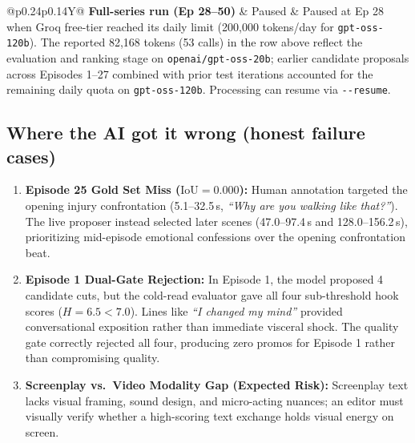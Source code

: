 \documentclass[10pt,a4paper]{extarticle}
\begin{document}
\begin{tabularx}{\linewidth}{@{}p{0.24\linewidth}p{0.14\linewidth}Y@{}}
\addlinespace[3pt]
\textbf{Full-series run (Ep 28--50)} & Paused & Paused at Ep 28 when Groq free-tier reached its daily limit (200,000 tokens/day for \texttt{gpt-oss-120b}). The reported 82,168 tokens (53 calls) in the row above reflect the evaluation and ranking stage on \texttt{openai/gpt-oss-20b}; earlier candidate proposals across Episodes 1--27 combined with prior test iterations accounted for the remaining daily quota on \texttt{gpt-oss-120b}. Processing can resume via \texttt{-{}-resume}. \\
\bottomrule
\end{tabularx}
\normalsize

\subsection*{Where the AI got it wrong (honest failure cases)}
\begin{enumerate}[leftmargin=*, nosep]
    \item \textbf{Episode 25 Gold Set Miss ($\text{IoU} = 0.000$):} Human annotation targeted the opening injury confrontation (5.1--32.5\,s, \textit{``Why are you walking like that?''}). The live proposer instead selected later scenes (47.0--97.4\,s and 128.0--156.2\,s), prioritizing mid-episode emotional confessions over the opening confrontation beat.
    \item \textbf{Episode 1 Dual-Gate Rejection:} In Episode 1, the model proposed 4 candidate cuts, but the cold-read evaluator gave all four sub-threshold hook scores ($H = 6.5 < 7.0$). Lines like \textit{``I changed my mind''} provided conversational exposition rather than immediate visceral shock. The quality gate correctly rejected all four, producing zero promos for Episode 1 rather than compromising quality.
    \item \textbf{Screenplay vs.\ Video Modality Gap (Expected Risk):} Screenplay text lacks visual framing, sound design, and micro-acting nuances; an editor must visually verify whether a high-scoring text exchange holds visual energy on screen.
\end{enumerate}
\end{document}
